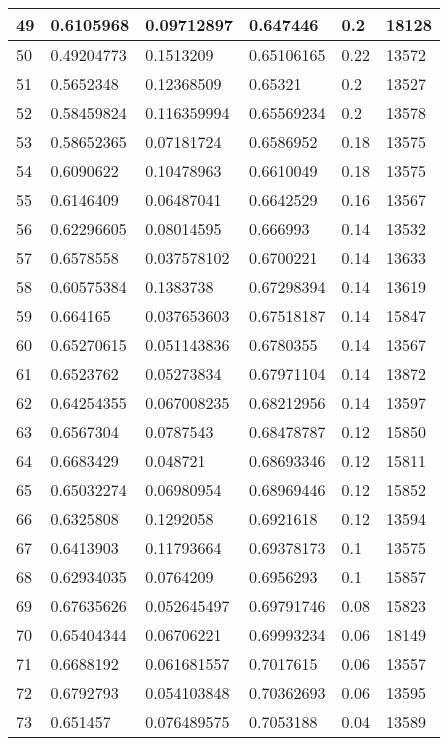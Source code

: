 \begin{longtable}{|l|l|l|l|l|l|}
49 & 0.6105968 & 0.09712897 & 0.647446 & 0.2 & 18128 \\ \hline 
50 & 0.49204773 & 0.1513209 & 0.65106165 & 0.22 & 13572 \\ \hline 
51 & 0.5652348 & 0.12368509 & 0.65321 & 0.2 & 13527 \\ \hline 
52 & 0.58459824 & 0.116359994 & 0.65569234 & 0.2 & 13578 \\ \hline 
53 & 0.58652365 & 0.07181724 & 0.6586952 & 0.18 & 13575 \\ \hline 
54 & 0.6090622 & 0.10478963 & 0.6610049 & 0.18 & 13575 \\ \hline 
55 & 0.6146409 & 0.06487041 & 0.6642529 & 0.16 & 13567 \\ \hline 
56 & 0.62296605 & 0.08014595 & 0.666993 & 0.14 & 13532 \\ \hline 
57 & 0.6578558 & 0.037578102 & 0.6700221 & 0.14 & 13633 \\ \hline 
58 & 0.60575384 & 0.1383738 & 0.67298394 & 0.14 & 13619 \\ \hline 
59 & 0.664165 & 0.037653603 & 0.67518187 & 0.14 & 15847 \\ \hline 
60 & 0.65270615 & 0.051143836 & 0.6780355 & 0.14 & 13567 \\ \hline 
61 & 0.6523762 & 0.05273834 & 0.67971104 & 0.14 & 13872 \\ \hline 
62 & 0.64254355 & 0.067008235 & 0.68212956 & 0.14 & 13597 \\ \hline 
63 & 0.6567304 & 0.0787543 & 0.68478787 & 0.12 & 15850 \\ \hline 
64 & 0.6683429 & 0.048721 & 0.68693346 & 0.12 & 15811 \\ \hline 
65 & 0.65032274 & 0.06980954 & 0.68969446 & 0.12 & 15852 \\ \hline 
66 & 0.6325808 & 0.1292058 & 0.6921618 & 0.12 & 13594 \\ \hline 
67 & 0.6413903 & 0.11793664 & 0.69378173 & 0.1 & 13575 \\ \hline 
68 & 0.62934035 & 0.0764209 & 0.6956293 & 0.1 & 15857 \\ \hline 
69 & 0.67635626 & 0.052645497 & 0.69791746 & 0.08 & 15823 \\ \hline 
70 & 0.65404344 & 0.06706221 & 0.69993234 & 0.06 & 18149 \\ \hline 
71 & 0.6688192 & 0.061681557 & 0.7017615 & 0.06 & 13557 \\ \hline 
72 & 0.6792793 & 0.054103848 & 0.70362693 & 0.06 & 13595 \\ \hline 
73 & 0.651457 & 0.076489575 & 0.7053188 & 0.04 & 13589 \\ \hline 

\end{longtable}
